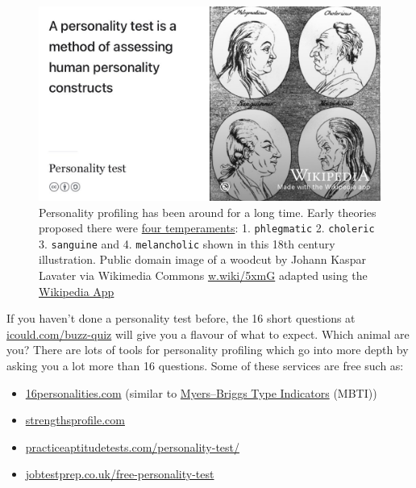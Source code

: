 \documentclass[
]{book}
\providecommand{\tightlist}{%
  \setlength{\itemsep}{0pt}\setlength{\parskip}{0pt}}
\begin{document}
\begin{figure}

{\centering \includegraphics[width=1\linewidth]{images/personality-test} 

}

\caption{Personality profiling has been around for a long time. Early theories proposed there were \href{https://en.wikipedia.org/wiki/Four_temperaments}{four temperaments}: 1. \texttt{phlegmatic} 2. \texttt{choleric} 3. \texttt{sanguine} and 4. \texttt{melancholic} shown in this 18th century illustration. Public domain image of a woodcut by Johann Kaspar Lavater via Wikimedia Commons \href{https://w.wiki/5xmG}{w.wiki/5xmG} adapted using the \href{https://apps.apple.com/gb/app/wikipedia/id324715238}{Wikipedia App}}\label{fig:personality-fig}
\end{figure}



If you haven't done a personality test before, the 16 short questions at \href{https://icould.com/buzz-quiz}{icould.com/buzz-quiz} will give you a flavour of what to expect. Which animal are you? There are lots of tools for personality profiling which go into more depth by asking you a lot more than 16 questions. Some of these services are free such as:

\begin{itemize}
\tightlist
\item
  \href{https://www.16personalities.com}{16personalities.com} (similar to \href{https://en.wikipedia.org/wiki/Myers\%E2\%80\%93Briggs_Type_Indicator}{Myers--Briggs Type Indicators} (MBTI))
\item
  \href{https://strengthsprofile.com/en-GB/Products/Free}{strengthsprofile.com}
\item
  \href{https://www.practiceaptitudetests.com/personality-test/}{practiceaptitudetests.com/personality-test/}
\item
  \href{https://www.jobtestprep.co.uk/free-personality-test}{jobtestprep.co.uk/free-personality-test}
\end{itemize}
\end{document}
